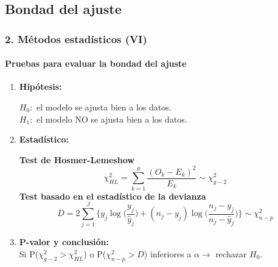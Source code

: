 \documentclass{beamer}
\begin{document}
\subsection{Bondad del ajuste}
\begin{frame}
\frametitle{2. Métodos estadísticos (VI)}
\framesubtitle{Pruebas para evaluar la bondad del ajuste}

	\begin{enumerate}
		\item \textbf{Hipótesis:}
			\begin{center}
				$H_0:$ el modelo se ajusta bien a los datos.\\ 
				$H_1:$ el modelo NO se ajusta bien a los datos. 
			\end{center}
		\item \textbf{Estadístico:}
			\begin{block}{}
				\footnotesize
						{\color{green!55!blue} \textbf{Test de Hosmer-Lemeshow}}
						$$\chi^2_{HL}=\sum_{k=1}^{g}\frac{(O_k-E_k)^2}{E_k} \sim \chi^2_{g-2}$$
						{\color{green!55!blue} \textbf{Test basado en el estadístico de la devianza}}
						$$D=2 \sum_{j=1}^{J}\Big\{ y_j \log\Big( \frac{y_j}{\hat{y}_j}\Big)+(n_j-y_j)\log\Big( \frac{n_j-y_j}{n_j-\hat{y}_j}\Big)\Big\} \sim \chi^2_{n-p}$$
				\normalsize
		\end{block}
		\item \textbf{P-valor y conclusión:}\\
		\vspace{0.2cm}
			Si P($ \chi^2_{g-2} > \chi^2_{HL}$) o P($ \chi^2_{n-p} > D$) inferiores a $\alpha \rightarrow$ rechazar $H_0$.
	\end{enumerate}
\end{frame}

\end{document}
